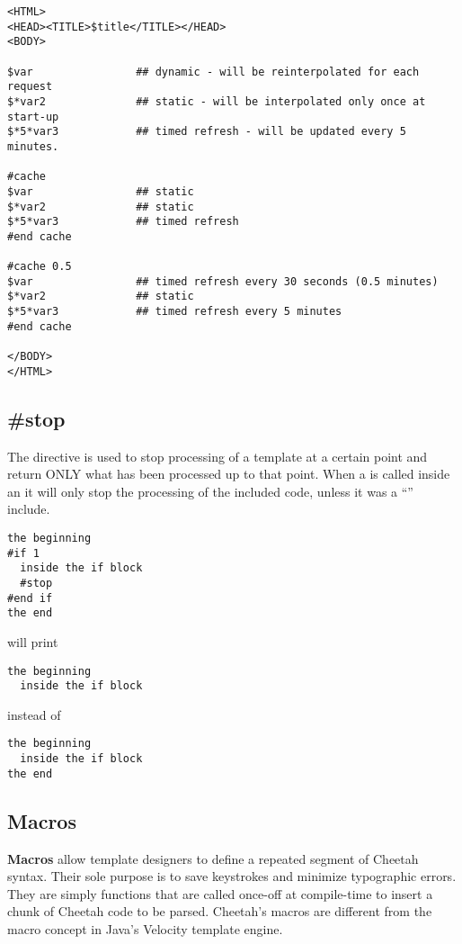 \begin{verbatim}
<HTML>
<HEAD><TITLE>$title</TITLE></HEAD>
<BODY>

$var                ## dynamic - will be reinterpolated for each request
$*var2              ## static - will be interpolated only once at start-up
$*5*var3            ## timed refresh - will be updated every 5 minutes.

#cache
$var                ## static
$*var2              ## static
$*5*var3            ## timed refresh
#end cache

#cache 0.5
$var                ## timed refresh every 30 seconds (0.5 minutes)
$*var2              ## static
$*5*var3            ## timed refresh every 5 minutes
#end cache

</BODY>
</HTML>
\end{verbatim}


\subsection{\#stop}
\label{directives.stop}

The  directive is used to stop processing of a template at a
certain point and return ONLY what has been processed up to that point.  When a
 is called inside an  it will only stop the
processing of the included code, unless it was a ``'' include.

\begin{verbatim}
the beginning
#if 1
  inside the if block
  #stop
#end if
the end
\end{verbatim}

will print 
\begin{verbatim}
the beginning
  inside the if block
\end{verbatim}

instead of 
\begin{verbatim}
the beginning
  inside the if block
the end
\end{verbatim}

\subsection{Macros}
\label{directives.macros}


{\bf Macros} allow template designers to define a repeated segment of Cheetah
syntax.  Their sole purpose is to save keystrokes and minimize typographic
errors.  They are simply functions that are called once-off at compile-time to
insert a chunk of Cheetah code to be parsed.  Cheetah's macros are different
from the macro concept in Java's Velocity template engine.

